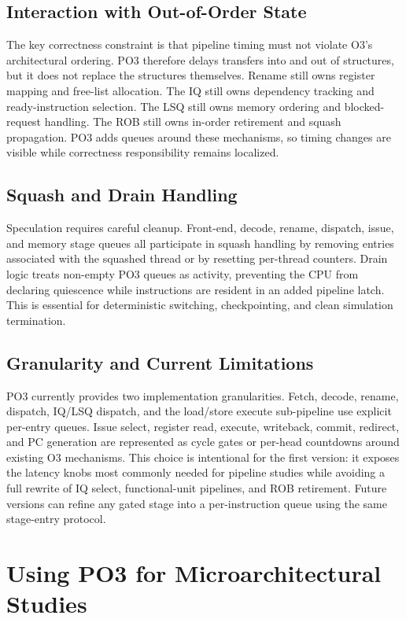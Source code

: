 \documentclass[10pt,twocolumn]{article}
\newcommand{\po}{\textsc{PO3}}
\newcommand{\oo}{\textsc{O3}}
\begin{document}
\subsection{Interaction with Out-of-Order State}
The key correctness constraint is that pipeline timing must not violate \oo{}'s architectural ordering.  \po{} therefore delays transfers into and out of structures, but it does not replace the structures themselves.  Rename still owns register mapping and free-list allocation.  The IQ still owns dependency tracking and ready-instruction selection.  The LSQ still owns memory ordering and blocked-request handling.  The ROB still owns in-order retirement and squash propagation.  \po{} adds queues around these mechanisms, so timing changes are visible while correctness responsibility remains localized.

\subsection{Squash and Drain Handling}
Speculation requires careful cleanup.  Front-end, decode, rename, dispatch, issue, and memory stage queues all participate in squash handling by removing entries associated with the squashed thread or by resetting per-thread counters.  Drain logic treats non-empty \po{} queues as activity, preventing the CPU from declaring quiescence while instructions are resident in an added pipeline latch.  This is essential for deterministic switching, checkpointing, and clean simulation termination.

\subsection{Granularity and Current Limitations}
\po{} currently provides two implementation granularities.  Fetch, decode, rename, dispatch, IQ/LSQ dispatch, and the load/store execute sub-pipeline use explicit per-entry queues.  Issue select, register read, execute, writeback, commit, redirect, and PC generation are represented as cycle gates or per-head countdowns around existing \oo{} mechanisms.  This choice is intentional for the first version: it exposes the latency knobs most commonly needed for pipeline studies while avoiding a full rewrite of IQ select, functional-unit pipelines, and ROB retirement.  Future versions can refine any gated stage into a per-instruction queue using the same stage-entry protocol.

\section{Using PO3 for Microarchitectural Studies}
\end{document}

